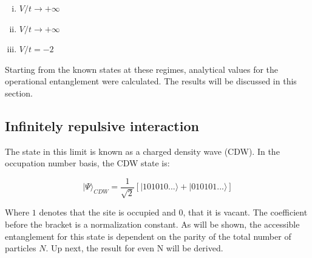 	\begin{enumerate} [i)]
		
		\item$V/t \to +\infty $
		\item $V/t \to +\infty $
		\item $V/t = -2$
	\end{enumerate}
	
	Starting from the known states at these regimes, analytical values for the operational entanglement were calculated. The results will be discussed in this section.

	\subsection{Infinitely repulsive interaction}
		The state in this limit is known as a charged density wave (CDW). In the occupation number basis, the CDW state is:

\begin{equation}
| \Psi \rangle_{CDW} = \frac{1}{\sqrt{2}} [|101010... \rangle + |010101... \rangle ] 
\end{equation}

Where $1$ denotes that the site is occupied and $0$, that it is vacant. The coefficient before the bracket is a normalization constant. As will be shown, the accessible entanglement for this state is dependent on the parity of the total number of particles $N$. Up next, the result for even N will be derived.

